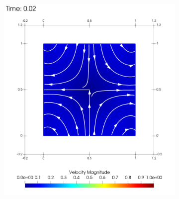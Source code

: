             \begin{figure}
                \begin{centering}
                    \begin{subfigure}{0.45\textwidth}
                        \begin{centering}
                            \includegraphics[width=\textwidth]{diagrams/results-contractions/mm_5_white.0002.png}
                            \caption{}
                            \label{fig:square-solid-wall-flow:02}
                        \end{centering}
                    \end{subfigure}
                    \begin{subfigure}{0.45\textwidth}
                        \begin{centering}

\end{centering}
\end{subfigure}
\end{centering}
\end{figure}
